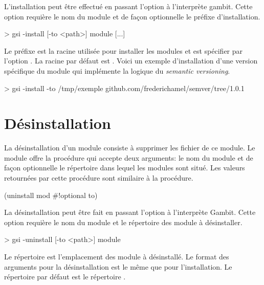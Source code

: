 L'installation peut être effectué en passant l'option 
à l'interprète gambit. Cette option requière le nom du module et
de façon optionnelle le préfixe d'installation.
\begin{center}
  \begin{mplisting}{0.8}
> gsi -install [-to <path>] module [...]
\end{mplisting}
\end{center}
Le préfixe  est la racine utilisée pour installer les modules
et est spécifier par l'option .  La racine par défaut est
. Voici un exemple d'installation d'une version spécifique du module
 qui implémente la logique du \textit{semantic versioning}.

\begin{center}
  \begin{mplisting}{1}
> gsi -install -to /tmp/exemple github.com/frederichamel/semver/tree/1.0.1
\end{mplisting}
\end{center}

\section{Désinstallation}

La désinstallation d'un module consiste à supprimer les fichier
de ce module. Le module  offre la procédure
 qui accepte deux arguments: le nom du module
et de façon optionnelle le répertoire dans lequel les modules
sont situé. Les valeurs retournées par cette procédure sont
similaire à la procédure.
\begin{center}
  \begin{mplisting}{0.4}
(uninstall mod #!optional to)
\end{mplisting}
\end{center}
La désinstallation peut être fait en passant l'option 
à l'interprète Gambit. Cette option requière le nom du module et le
répertoire  des module à désinstaller.
\begin{center}
  \begin{mplisting}{0.8}
> gsi -uninstall [-to <path>] module
\end{mplisting}
\end{center}
Le répertoire  est l'emplacement des module
à désinstallé. Le format des arguments pour la désinstallation
est le même que pour l'installation. Le répertoire par défaut
est le répertoire .

